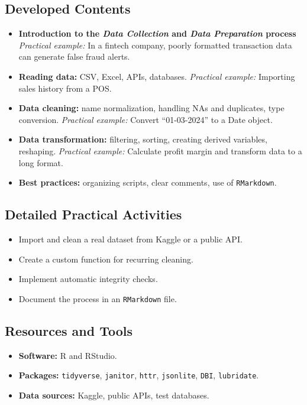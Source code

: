 \subsection{\textcolor{subsectionblue}{Developed Contents}}
\begin{itemize}
  \item \textbf{Introduction to the \textit{Data Collection} and \textit{Data Preparation} process}  
  \textit{Practical example:} In a fintech company, poorly formatted transaction data can generate false fraud alerts.
  \item \textbf{Reading data:} CSV, Excel, APIs, databases.  
  \textit{Practical example:} Importing sales history from a POS.
  \item \textbf{Data cleaning:} name normalization, handling NAs and duplicates, type conversion.  
  \textit{Practical example:} Convert “01-03-2024” to a Date object.
  \item \textbf{Data transformation:} filtering, sorting, creating derived variables, reshaping.  
  \textit{Practical example:} Calculate profit margin and transform data to a long format.
  \item \textbf{Best practices:} organizing scripts, clear comments, use of \texttt{RMarkdown}.
\end{itemize}

\subsection{\textcolor{subsectionblue}{Detailed Practical Activities}}
\begin{itemize}
  \item Import and clean a real dataset from Kaggle or a public API.
  \item Create a custom function for recurring cleaning.
  \item Implement automatic integrity checks.
  \item Document the process in an \texttt{RMarkdown} file.
\end{itemize}

\subsection{\textcolor{subsectionblue}{Resources and Tools}}
\begin{itemize}
  \item \textbf{Software:} R and RStudio.
  \item \textbf{Packages:} \texttt{tidyverse}, \texttt{janitor}, \texttt{httr}, \texttt{jsonlite}, \texttt{DBI}, \texttt{lubridate}.
  \item \textbf{Data sources:} Kaggle, public APIs, test databases.
\end{itemize}


